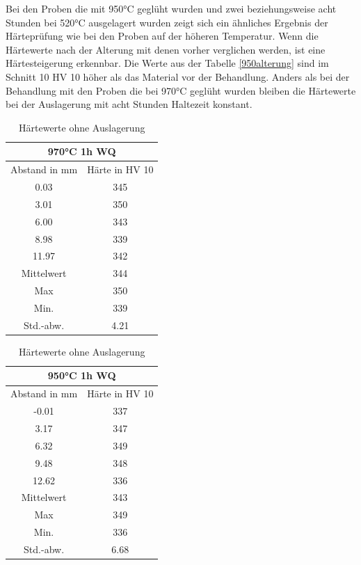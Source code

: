 \documentclass[a4paper, 11pt]{tubsreprt}
\begin{document}
Bei den Proben die mit 950°C geglüht wurden und zwei beziehungsweise acht Stunden bei 520°C ausgelagert wurden zeigt sich ein ähnliches Ergebnis der Härteprüfung wie bei den Proben auf der höheren Temperatur. Wenn die Härtewerte nach der Alterung mit denen vorher verglichen werden, ist eine Härtesteigerung erkennbar. Die Werte aus der Tabelle \ref{950alterung} sind im Schnitt 10 HV 10 höher als das Material vor der Behandlung. Anders als bei der Behandlung mit den Proben die bei 970°C geglüht wurden bleiben die Härtewerte bei der Auslagerung mit acht Stunden Haltezeit konstant. 
\begin{table}[t]	%
\begin{tabular}{c|c}
\multicolumn{2}{c}{970°C 1h WQ} \\
\hline 
Abstand in mm	& Härte in HV 10 \\
0.03	& 345\\
3.01	& 350\\
6.00	& 343\\
8.98	& 339 \\
11.97	& 342\\
Mittelwert	& 344 \\
Max	& 350 \\
Min.	& 339 \\
Std.-abw. &	4.21 \\

\end{tabular}
\begin{tabular}{c|c}
\multicolumn{2}{c}{950°C 1h WQ} \\
\hline 	
Abstand in mm	& 	Härte in HV 10 \\
-0.01	&	337 \\
3.17	&	347 \\
6.32	&	349 \\
9.48	&	348 \\ 
12.62	&	336 \\
Mittelwert &	343 \\
Max	&	349 \\
Min.	&	336 \\
Std.-abw.	&	6.68 \\

\end{tabular}
\caption{Härtewerte ohne Auslagerung}
\label{Hearte ohne Behandlung}
\end{table}
\end{document}
